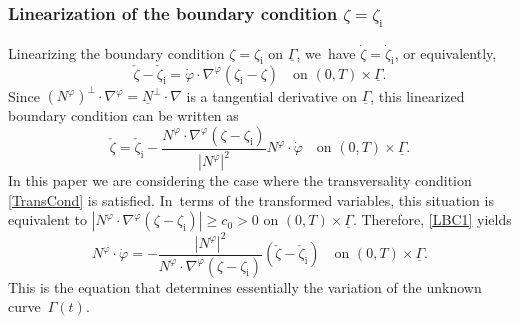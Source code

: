 \documentclass[11pt]{article}
\newcommand{\ul}[1]{\underline{#1}}
\newcommand{\itGamma}{\mathit{\Gamma}}
\theoremstyle{definition}
\begin{document}
\subsubsection{Linearization of the boundary condition $\zeta=\zeta_\mathrm{i}$}
Linearizing the boundary condition $\zeta=\zeta_\mathrm{i}$ on $\ul{\itGamma}$, we~have $\dot{\zeta}=\dot{\zeta}_\mathrm{i}$, or equivalently,
\[
\check{\zeta}-\check{\zeta}_\mathrm{i} = \dot{\varphi}\cdot\nabla^\varphi(\zeta_\mathrm{i}-\zeta) \quad\text{on } (0,T)\times\ul{\itGamma}.
\]
Since $(N^\varphi)^\perp\cdot\nabla^\varphi=\ul{N}^\perp\cdot\nabla$ is a tangential derivative on $\ul{\itGamma}$,
this linearized boundary condition can be written as
\begin{equation}\label{LBC1}
\check{\zeta}=\check{\zeta}_\mathrm{i}-\frac{N^\varphi\cdot\nabla^\varphi(\zeta-\zeta_\mathrm{i})}{|N^\varphi|^2} N^\varphi\cdot\dot{\varphi}
\quad\text{on } (0,T)\times\ul{\itGamma}.
\end{equation}
In this paper we are considering the case where the transversality condition \eqref{TransCond} is satisfied. In~terms of the transformed variables,
this situation is equivalent to $|N^\varphi\cdot\nabla^\varphi(\zeta-\zeta_\mathrm{i})| \geq c_0>0$ on $(0,T)\times\ul{\itGamma}$.
Therefore, \eqref{LBC1} yields
\begin{equation}\label{EqPhi}
N^\varphi\cdot\dot{\varphi} = -\frac{|N^\varphi|^2}{N^\varphi\cdot\nabla^\varphi(\zeta-\zeta_\mathrm{i})}(\check{\zeta} -\check{\zeta}_\mathrm{i})
\quad\text{on } (0,T)\times\ul{\itGamma}.
\end{equation}
This is the equation that determines essentially the variation of the unknown curve~$\itGamma(t)$.
\end{document}
